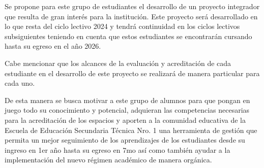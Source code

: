 Se propone para este grupo de estudiantes el desarrollo de un proyecto integrador que resulta de gran interés para la institución. Este proyecto será desarrollado en lo que resta del ciclo lectivo 2024 y tendrá continuidad en los ciclos lectivos subsiguientes teniendo en cuenta que estos estudiantes se encontrarán cursando hasta su egreso en el año 2026.

Cabe mencionar que los alcances de la evaluación y acreditación de cada estudiante en el desarrollo de este proyecto se realizará de manera particular para cada uno. 

De esta manera se busca motivar a este grupo de alumnos para que pongan en juego todo su conocimiento y potencial, adquieran las competencias necesarias para la acreditación de los espacios y aporten a la comunidad educativa de la Escuela de Educación Secundaria Técnica Nro. 1 una herramienta de gestión que permita un mejor seguimiento de los aprendizajes de los estudiantes desde su ingreso en 1er año hasta su egreso en 7mo así como también ayudar a la implementación del nuevo régimen académico de manera orgánica.
